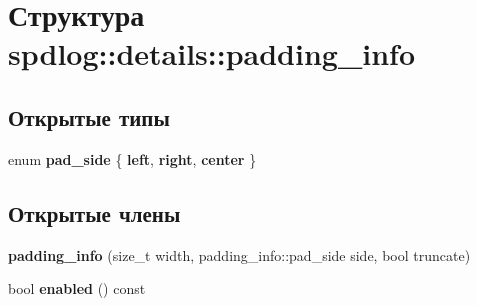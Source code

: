 \hypertarget{structspdlog_1_1details_1_1padding__info}{}\section{Структура spdlog\+:\+:details\+:\+:padding\+\_\+info}
\label{structspdlog_1_1details_1_1padding__info}
\subsection*{Открытые типы}
\begin{DoxyCompactItemize}
\item 
\mbox{\label{structspdlog_1_1details_1_1padding__info_aa2ad84ba80fb8fc36b753d1a34e4942e}} 
enum {\bfseries pad\+\_\+side} \{ {\bfseries left}, 
{\bfseries right}, 
{\bfseries center}
 \}
\end{DoxyCompactItemize}
\subsection*{Открытые члены}
\begin{DoxyCompactItemize}
\item 
\mbox{\label{structspdlog_1_1details_1_1padding__info_abf369d07aa02b1b42b0575d760e12349}} 
{\bfseries padding\+\_\+info} (size\+\_\+t width, padding\+\_\+info\+::pad\+\_\+side side, bool truncate)
\item 
\mbox{\label{structspdlog_1_1details_1_1padding__info_a2c315d1c5ccdac54957d3d9281830ea9}} 
bool {\bfseries enabled} () const
\end{DoxyCompactItemize}
